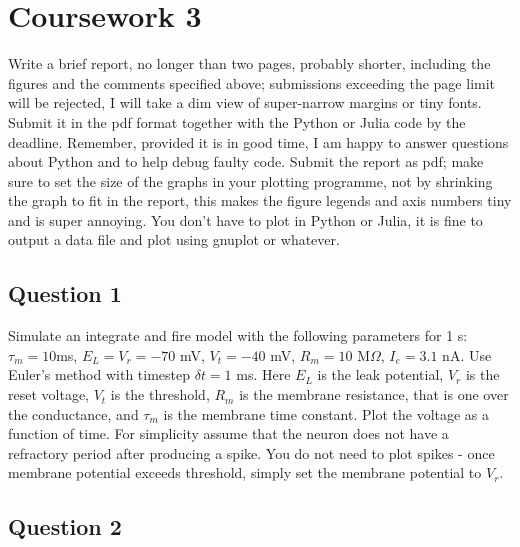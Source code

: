 \documentclass[12pt]{article}
\begin{document}
\section*{Coursework 3}

Write a brief report, no longer than two pages, probably shorter,
including the figures and the comments specified above; submissions
exceeding the page limit will be rejected, I will take a dim view of
super-narrow margins or tiny fonts. Submit it in the pdf format
together with the Python or Julia code by the deadline. Remember,
provided it is in good time, I am happy to answer questions about
Python and to help debug faulty code. Submit the report as pdf; make
sure to set the size of the graphs in your plotting programme, not by
shrinking the graph to fit in the report, this makes the figure
legends and axis numbers tiny and is super annoying. You don't have to
plot in Python or Julia, it is fine to output a data file and plot
using gnuplot or whatever.

\subsection*{Question 1}

Simulate an integrate and fire model with the following
  parameters for 1 s: $\tau_m = 10 $ms, $E_L = V_r = -70$ mV, $V_t =
  -40$ mV, $R_m= 10$ M$\Omega$, $I_e = 3.1 $ nA. Use Euler's method
  with timestep $\delta t = 1$ ms. Here $E_L$ is the leak potential,
  $V_r$ is the reset voltage, $V_t$ is the threshold, $R_m$ is the
  membrane resistance, that is one over the conductance, and $\tau_m$
  is the membrane time constant. Plot the voltage as a function of
  time. For simplicity assume that the neuron does not have a
  refractory period after producing a spike. You do not need to plot
  spikes - once membrane potential exceeds threshold, simply set the
  membrane potential to $V_r$.

\subsection*{Question 2}
\end{document}
